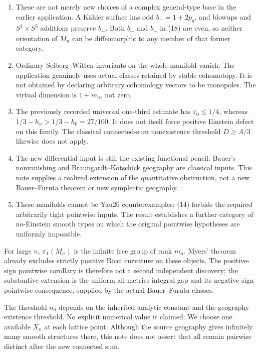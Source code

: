 \documentclass[
  10pt,
]{article}
\providecommand{\tightlist}{%
  \setlength{\itemsep}{0pt}\setlength{\parskip}{0pt}}
\begin{document}
\begin{enumerate}
\def\labelenumi{\arabic{enumi}.}
\tightlist
\item
  These are not merely new choices of a complex general-type base in the
  earlier application. A Kähler surface has odd \(b_+=1+2p_g\), and
  blowups and \(S^1\times S^3\) additions preserve \(b_+\). Both \(b_+\)
  and \(b_-\) in (18) are even, so neither orientation of \(M_n\) can be
  diffeomorphic to any member of that former category.
\item
  Ordinary Seiberg--Witten invariants on the whole manifold vanish. The
  application genuinely uses actual classes retained by stable
  cohomotopy. It is not obtained by declaring arbitrary cohomology
  vectors to be monopoles. The virtual dimension is \(1+m_n\), not zero.
\item
  The previously recorded universal one-third estimate has
  \(\varepsilon_0\le1/4\), whereas \(1/3-h_n>1/3-h_0=27/100\). It does
  not itself force positive Einstein defect on this family. The
  classical connected-sum nonexistence threshold \(D\ge A/3\) likewise
  does not apply.
\item
  The new differential input is still the existing functional pencil.
  Bauer's nonvanishing and Braungardt--Kotschick geography are classical
  inputs. This note supplies a realized extension of the quantitative
  obstruction, not a new Bauer--Furuta theorem or new symplectic
  geography.
\item
  These manifolds cannot be Yau26 counterexamples: (14) forbids the
  required arbitrarily tight pointwise inputs. The result establishes a
  further category of no-Einstein smooth types on which the original
  pointwise hypotheses are uniformly impossible.
\end{enumerate}

For large \(n\), \(\pi_1(M_n)\) is the infinite free group of rank
\(m_n\). Myers' theorem already excludes strictly positive Ricci
curvature on these objects. The positive-sign pointwise corollary is
therefore not a second independent discovery; the substantive extension
is the uniform all-metrics integral gap and its negative-sign pointwise
consequence, supplied by the actual Bauer--Furuta classes.

The threshold \(n_0\) depends on the inherited analytic constant and the
geography existence threshold. No explicit numerical value is claimed.
We choose one available \(X_n\) at each lattice point. Although the
source geography gives infinitely many smooth structures there, this
note does not assert that all remain pairwise distinct after the new
connected sum.
\end{document}
